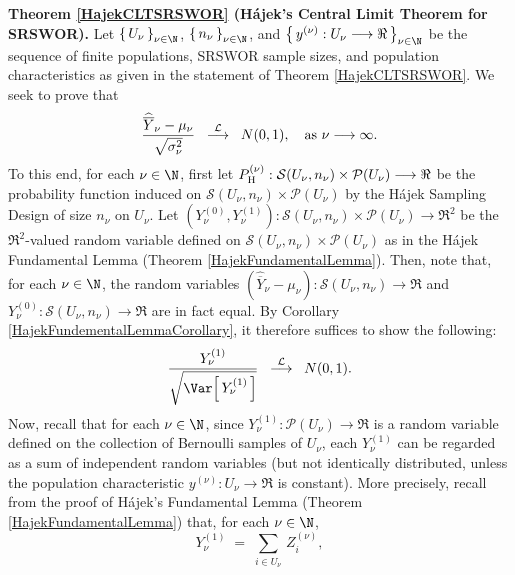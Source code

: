 \vskip 0.5cm
\proofof \textbf{Theorem \ref{HajekCLTSRSWOR} (H\'ajek's Central Limit Theorem for SRSWOR).}
\vskip 0.2cm
\noindent
Let $\left\{\,U_{\nu}\,\right\}_{\nu\in\N}$, $\left\{\,n_{\nu}\,\right\}_{\nu\in\N}$, and
$\left\{\,y^{(\nu)} : U_{\nu} \longrightarrow \Re\,\right\}_{\nu\in\N}$
be the sequence of finite populations, SRSWOR sample sizes, and
population characteristics
as given in the statement of Theorem \ref{HajekCLTSRSWOR}.
We seek to prove that
\begin{equation*}
\dfrac{\widehat{\overline{Y}}_{\nu} - \mu_{\nu}}{\sqrt{\sigma^{2}_{\nu}}}
\;\;\overset{\mathcal{L}}{\longrightarrow}\;\;
N(0,1),
\quad
\textnormal{as $\nu\longrightarrow\infty$}.
\end{equation*}
To this end, for each $\nu \in \N$, first let 
$P_{\textnormal{H}}^{(\nu)} : \mathcal{S}(U_{\nu},n_{\nu}) \times \mathcal{P}(U_{\nu}) \longrightarrow \Re$
be the probability function induced on $\mathcal{S}(U_{\nu},n_{\nu}) \times \mathcal{P}(U_{\nu})$
by the H\'ajek Sampling Design of size $n_{\nu}$ on $U_{\nu}$.
Let $\left(Y^{(0)}_{\nu},Y^{(1)}_{\nu}\right) : \mathcal{S}(U_{\nu},n_{\nu}) \times \mathcal{P}(U_{\nu}) \longrightarrow\Re^{2}$
be the $\Re^{2}$-valued random variable defined on $\mathcal{S}(U_{\nu},n_{\nu}) \times \mathcal{P}(U_{\nu})$
as in the H\'ajek Fundamental Lemma (Theorem \ref{HajekFundamentalLemma}).
Then, note that, for each $\nu\in\N$, the random variables
$\left(\widehat{\overline{Y}}_{\nu} - \mu_{\nu}\right) : \mathcal{S}(U_{\nu},n_{\nu}) \longrightarrow \Re$ and
$Y^{(0)}_{\nu} : \mathcal{S}(U_{\nu},n_{\nu}) \longrightarrow \Re$
are in fact equal.
By Corollary \ref{HajekFundementalLemmaCorollary}, it therefore suffices to show the following:
\begin{equation*}
\dfrac{Y^{(1)}_{\nu}}{\sqrt{\Var\!\left[\,Y^{(1)}_{\nu}\,\right]}} \;\; \overset{\mathcal{L}}{\longrightarrow} \;\; N(0,1).
\end{equation*}
Now, recall that for each $\nu\in\N$,
since $Y^{(1)}_{\nu} : \mathcal{P}(U_{\nu}) \longrightarrow \Re$ is a random variable
defined on the collection of Bernoulli samples of $U_{\nu}$,
each $Y^{(1)}_{\nu}$ can be regarded as a sum of independent random variables
(but not identically distributed, unless the population characteristic
$y^{(\nu)} : U_{\nu} \longrightarrow \Re$ is constant).
More precisely, recall from the proof of H\'ajek's Fundamental Lemma
(Theorem \ref{HajekFundamentalLemma}) that, for each $\nu\in\N$,
\begin{equation*}
Y^{(1)}_{\nu} \; = \; \sum_{i\in U_{\nu}}\,Z^{(\nu)}_{i},
\end{equation*}
